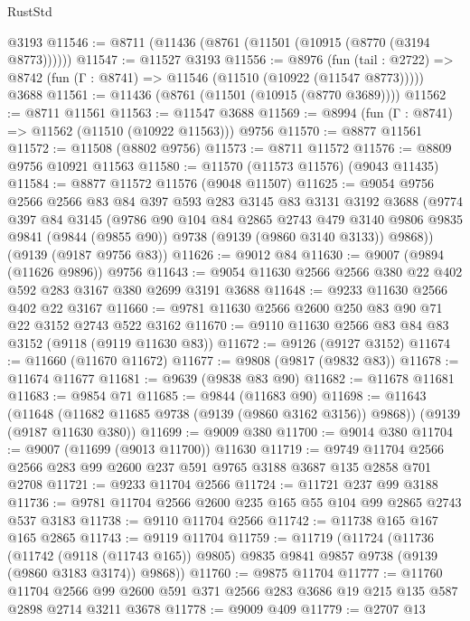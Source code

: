 \begin{lexlean}{RustStd}
\begin{coremodule}
    @3193
@11546 := @8711 (@11436 (@8761 (@11501 (@10915 (@8770 (@3194 @8773))))))
@11547 := @11527 @3193
@11556 := @8976
    (fun (tail : @2722) => @8742 (fun (Γ : @8741) => @11546 (@11510 (@10922 (@11547 @8773)))))
    @3688
@11561 := @11436 (@8761 (@11501 (@10915 (@8770 @3689))))
@11562 := @8711 @11561
@11563 := @11547 @3688
@11569 := @8994 (fun (Γ : @8741) => @11562 (@11510 (@10922 @11563))) @9756
@11570 := @8877 @11561
@11572 := @11508 (@8802 @9756)
@11573 := @8711 @11572
@11576 := @8809 @9756 @10921 @11563
@11580 := @11570 (@11573 @11576) (@9043 @11435)
@11584 := @8877 @11572 @11576 (@9048 @11507)
@11625 := @9054
    @9756
    @2566
    @2566
    @83
    @84
    @397
    @593
    @283
    @3145
    @83
    @3131
    @3192
    @3688
    (@9774
      @397
      @84
      @3145
      (@9786
        @90
        @104
        @84
        @2865
        @2743
        @479
        @3140
        @9806
        @9835
        @9841
        (@9844 (@9855 @90))
        @9738
        (@9139 (@9860 @3140 @3133))
        @9868))
    (@9139 (@9187 @9756 @83))
@11626 := @9012 @84
@11630 := @9007 (@9894 (@11626 @9896)) @9756
@11643 := @9054 @11630 @2566 @2566 @380 @22 @402 @592 @283 @3167 @380 @2699 @3191 @3688
@11648 := @9233 @11630 @2566 @402 @22 @3167
@11660 := @9781 @11630 @2566 @2600 @250 @83 @90 @71 @22 @3152 @2743 @522 @3162
@11670 := @9110 @11630 @2566 @83 @84 @83 @3152 (@9118 (@9119 @11630 @83))
@11672 := @9126 (@9127 @3152)
@11674 := @11660 (@11670 @11672)
@11677 := @9808 (@9817 (@9832 @83))
@11678 := @11674 @11677
@11681 := @9639 (@9838 @83 @90)
@11682 := @11678 @11681
@11683 := @9854 @71
@11685 := @9844 (@11683 @90)
@11698 := @11643
    (@11648 (@11682 @11685 @9738 (@9139 (@9860 @3162 @3156)) @9868))
    (@9139 (@9187 @11630 @380))
@11699 := @9009 @380
@11700 := @9014 @380
@11704 := @9007 (@11699 (@9013 @11700)) @11630
@11719 := @9749 @11704 @2566 @2566 @283 @99 @2600 @237 @591 @9765 @3188 @3687 @135 @2858 @701 @2708
@11721 := @9233 @11704 @2566
@11724 := @11721 @237 @99 @3188
@11736 := @9781 @11704 @2566 @2600 @235 @165 @55 @104 @99 @2865 @2743 @537 @3183
@11738 := @9110 @11704 @2566
@11742 := @11738 @165 @167 @165 @2865
@11743 := @9119 @11704
@11759 := @11719
    (@11724
      (@11736
        (@11742 (@9118 (@11743 @165)) @9805)
        @9835
        @9841
        @9857
        @9738
        (@9139 (@9860 @3183 @3174))
        @9868))
@11760 := @9875 @11704
@11777 := @11760
    @11704
    @2566
    @99
    @2600
    @591
    @371
    @2566
    @283
    @3686
    @19
    @215
    @135
    @587
    @2898
    @2714
    @3211
    @3678
@11778 := @9009 @409
@11779 := @2707 @13

\end{coremodule}
\end{lexlean}
